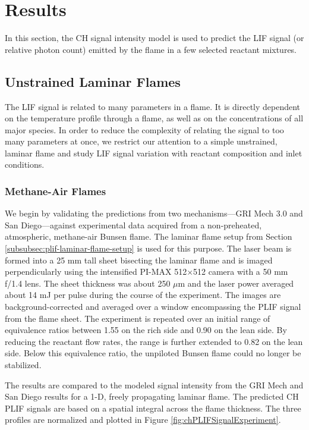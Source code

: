 \section{Results}

In this section, the CH signal intensity model is used to predict the LIF signal (or relative photon count) emitted by the flame in a few selected reactant mixtures.

\subsection{Unstrained Laminar Flames}

The LIF signal is related to many parameters in a flame.
It is directly dependent on the temperature profile through a flame, as well as on the concentrations of all major species.
In order to reduce the complexity of relating the signal to too many parameters at once, we restrict our attention to a simple unstrained, laminar flame and study LIF signal variation with reactant composition and inlet conditions.

\subsubsection{Methane-Air Flames}

We begin by validating the predictions from two mechanisms---GRI Mech 3.0 and San Diego---against experimental data acquired from a non-preheated, atmospheric, methane-air Bunsen flame.
The laminar flame setup from Section \ref{subsubsec:plif-laminar-flame-setup} is used for this purpose.
The laser beam is formed into a 25 mm tall sheet bisecting the laminar flame and is imaged perpendicularly using the intensified PI-MAX 512\(\times\)512 camera with a 50 mm f/1.4 lens.
The sheet thickness was about 250 \(\mu\)m and the laser power averaged about 14 mJ per pulse during the course of the experiment.
The images are background-corrected and averaged over a window encompassing the PLIF signal from the flame sheet.
The experiment is repeated over an initial range of equivalence ratios between 1.55 on the rich side and 0.90 on the lean side.
By reducing the reactant flow rates, the range is further extended to 0.82 on the lean side.
Below this equivalence ratio, the unpiloted Bunsen flame could no longer be stabilized.

The results are compared to the modeled signal intensity from the GRI Mech and San Diego results for a 1-D, freely propagating laminar flame.
The predicted CH PLIF signals are based on a spatial integral across the flame thickness.
The three profiles are normalized and plotted in Figure \ref{fig:chPLIFSignalExperiment}.


